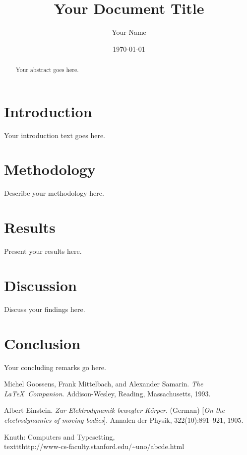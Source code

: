 \documentclass[12pt]{article}
\title{Your Document Title}
\author{Your Name}
\date{\today}
\begin{document}
\maketitle

\begin{abstract}
Your abstract goes here.
\end{abstract}

\section{Introduction}
Your introduction text goes here.

\section{Methodology}
Describe your methodology here.

\section{Results}
Present your results here.

\section{Discussion}
Discuss your findings here.

\section{Conclusion}
Your concluding remarks go here.

\begin{thebibliography}{9}
Michel Goossens, Frank Mittelbach, and Alexander Samarin. 
\textit{The \LaTeX\ Companion}. 
Addison-Wesley, Reading, Massachusetts, 1993.
 
Albert Einstein. 
\textit{Zur Elektrodynamik bewegter K{\"o}rper}. (German) 
[\textit{On the electrodynamics of moving bodies}]. 
Annalen der Physik, 322(10):891–921, 1905.

Knuth: Computers and Typesetting,
\\texttt{http://www-cs-faculty.stanford.edu/\~{}uno/abcde.html}
\end{thebibliography}
\end{document}
